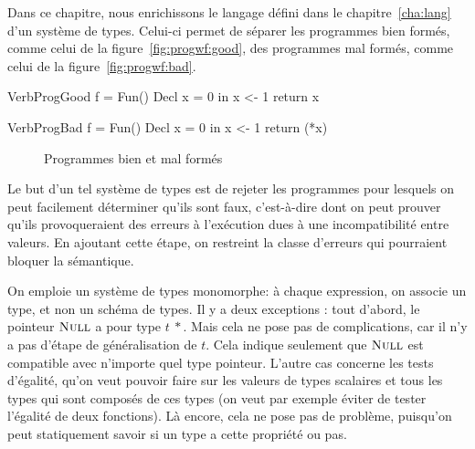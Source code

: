 Dans ce chapitre, nous enrichissons le langage défini dans le
chapitre~\ref{cha:lang} d'un système de types. Celui-ci permet de séparer les
programmes bien formés, comme celui de la figure~\ref{fig:progwf:good}, des
programmes mal formés, comme celui de la figure~\ref{fig:progwf:bad}.

\begin{SaveVerbatim}[]{VerbProgGood}
f = Fun() {
  Decl x = 0 in
  x <- 1
  return x
}
\end{SaveVerbatim}

\begin{SaveVerbatim}[]{VerbProgBad}
f = Fun() {
  Decl x = 0 in
  x <- 1
  return (*x)
}
\end{SaveVerbatim}

\begin{figure}[h]

  \centering

  \hspace{2cm}

  \caption{Programmes bien et mal formés}
\label{fig:progwf}

\end{figure}

Le but d'un tel système de types est de rejeter les programmes pour lesquels on
peut facilement déterminer qu'ils sont faux, c'est-à-dire dont on peut prouver
qu'ils provoqueraient des erreurs à l'exécution dues à une incompatibilité entre
valeurs. En ajoutant cette étape, on restreint la classe d'erreurs qui
pourraient bloquer la sémantique.

On emploie un système de types monomorphe: à chaque expression, on associe un
type, et non un schéma de types. Il y a deux exceptions : tout d'abord, le
pointeur $\textsc{Null}$ a pour type $t~*$. Mais cela ne pose pas de complications, car
il n'y a pas d'étape de généralisation de $t$. Cela indique seulement que
$\textsc{Null}$ est compatible avec n'importe quel type pointeur. L'autre cas concerne
les tests d'égalité, qu'on veut pouvoir faire sur les valeurs de types scalaires
et tous les types qui sont composés de ces types (on veut par exemple éviter de
tester l'égalité de deux fonctions). Là encore, cela ne pose pas de problème,
puisqu'on peut statiquement savoir si un type a cette propriété ou pas.

